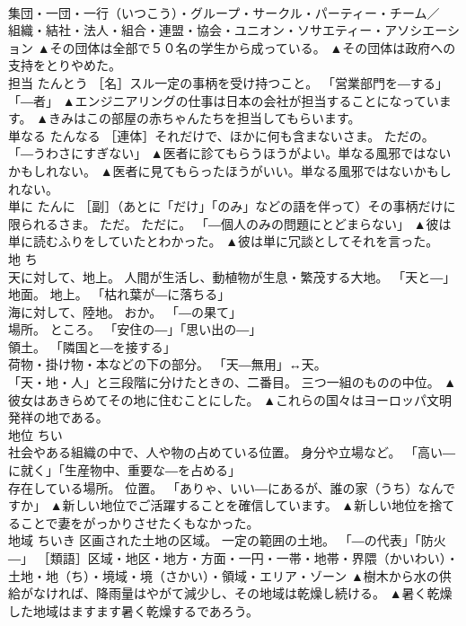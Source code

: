 \documentclass[8pt]{extreport}
\begin{document}
\begin{CJK}{UTF8}{min}
\\	集団・一団・一行（いつこう）・グループ・サークル・パーティー・チーム／
\\	組織・結社・法人・組合・連盟・協会・ユニオン・ソサエティー・アソシエーション	▲その団体は全部で５０名の学生から成っている。 ▲その団体は政府への支持をとりやめた。
\\	担当	たんとう	［名］スル一定の事柄を受け持つこと。 「営業部門を―する」「―者」	▲エンジニアリングの仕事は日本の会社が担当することになっています。 ▲きみはこの部屋の赤ちゃんたちを担当してもらいます。
\\	単なる	たんなる	［連体］それだけで、ほかに何も含まないさま。 ただの。 「―うわさにすぎない」	▲医者に診てもらうほうがよい。単なる風邪ではないかもしれない。 ▲医者に見てもらったほうがいい。単なる風邪ではないかもしれない。
\\	単に	たんに	［副］（あとに「だけ」「のみ」などの語を伴って）その事柄だけに限られるさま。 ただ。 ただに。 「―個人のみの問題にとどまらない」	▲彼は単に読むふりをしていたとわかった。 ▲彼は単に冗談としてそれを言った。
\\	地	ち	
\\	天に対して、地上。 人間が生活し、動植物が生息・繁茂する大地。 「天と―」 
\\	地面。 地上。 「枯れ葉が―に落ちる」 
\\	海に対して、陸地。 おか。 「―の果て」 
\\	場所。 ところ。 「安住の―」「思い出の―」 
\\	領土。 「隣国と―を接する」 
\\	荷物・掛け物・本などの下の部分。 「天―無用」↔天。 
\\	「天・地・人」と三段階に分けたときの、二番目。 三つ一組のものの中位。	▲彼女はあきらめてその地に住むことにした。 ▲これらの国々はヨーロッパ文明発祥の地である。
\\	地位	ちい	
\\	社会やある組織の中で、人や物の占めている位置。 身分や立場など。 「高い―に就く」「生産物中、重要な―を占める」 
\\	存在している場所。 位置。 「ありゃ、いい―にあるが、誰の家（うち）なんですか」	▲新しい地位でご活躍することを確信しています。 ▲新しい地位を捨てることで妻をがっかりさせたくもなかった。
\\	地域	ちいき	区画された土地の区域。 一定の範囲の土地。 「―の代表」「防火―」 ［類語］区域・地区・地方・方面・一円・一帯・地帯・界隈（かいわい）・土地・地（ち）・境域・境（さかい）・領域・エリア・ゾーン	▲樹木から水の供給がなければ、降雨量はやがて減少し、その地域は乾燥し続ける。 ▲暑く乾燥した地域はますます暑く乾燥するであろう。

\end{CJK}
\end{document}
